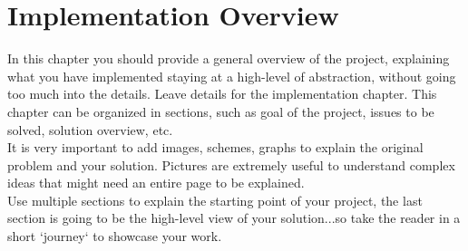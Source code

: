 \chapter{Implementation Overview}
\label{sec:implementation-overview}
In this chapter you should provide a general overview of the project, explaining what you have implemented staying at a high-level of abstraction, without going too much into the details. Leave details for the implementation chapter. This chapter can be organized in sections, such as goal of the project, issues to be solved, solution overview, etc.\\It is very important to add images, schemes, graphs to explain the original problem and your solution. Pictures are extremely useful to understand complex ideas that might need an entire page to be explained.\\Use multiple sections to explain the starting point of your project, the last section is going to be the high-level view of your solution...so take the reader in a short `journey` to showcase your work.